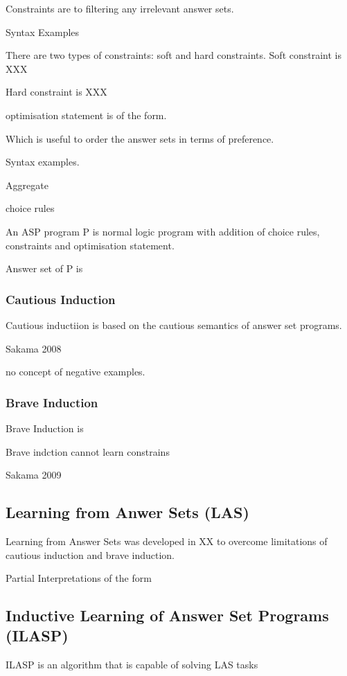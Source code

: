 \documentclass[12pt,twoside]{report}
\begin{document}
Constraints are to filtering any irrelevant answer sets.

Syntax Examples

There are two types of constraints: soft and hard constraints. Soft constraint is XXX

Hard constraint is XXX

optimisation statement is of the form.

Which is useful to order the answer sets in terms of preference.

Syntax examples.

Aggregate

choice rules

An ASP program P is normal logic program with addition of choice rules, constraints and optimisation statement.

Answer set of P is


\subsubsection{Cautious Induction}
Cautious inductiion is based on the cautious semantics of answer set programs.

Sakama 2008

no concept of negative examples.


\subsubsection{Brave Induction}

Brave Induction is


Brave indction cannot learn constrains


Sakama 2009

\subsection{Learning from Anwer Sets (LAS)}

Learning from Answer Sets was developed in XX to overcome limitations of cautious induction and brave induction.


Partial Interpretations of the form



\subsection{Inductive Learning of Answer Set Programs (ILASP)}

ILASP is an algorithm that is capable of solving LAS tasks
\end{document}
